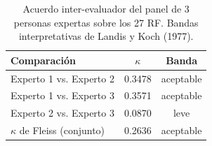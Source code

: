 \begin{table}[t]
\centering
\caption{Acuerdo inter-evaluador del panel de 3 personas
expertas sobre los 27 RF. Bandas interpretativas de Landis y Koch (1977).}
\label{tab:kappa}
\begin{tabular}{lcc}
\hline
\textbf{Comparación} & \textbf{$\kappa$} & \textbf{Banda} \\
\hline
Experto 1 vs. Experto 2 & 0.3478 & aceptable \\
Experto 1 vs. Experto 3 & 0.3571 & aceptable \\
Experto 2 vs. Experto 3 & 0.0870 & leve \\
\hline
$\kappa$ de Fleiss (conjunto) & 0.2636 & aceptable \\
\hline
\end{tabular}
\end{table}
